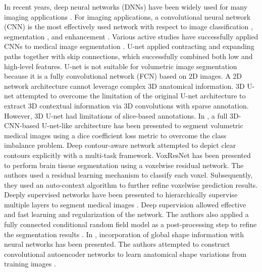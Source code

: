 \documentclass[journal]{IEEEtran}
\begin{document}
In recent years, deep neural networks (DNNs) have been widely used for many imaging applications \cite{simonyan2014very, he2016deep, szegedy2017inception, long2015fully, noh2015learning, badrinarayanan2017segnet, fu2017stacked, dong2016image, jegou2017one}. For imaging applications, a convolutional neural network (CNN) is the most effectively used network with respect to image classification \cite{simonyan2014very, he2016deep, szegedy2017inception}, segmentation \cite{long2015fully, noh2015learning, badrinarayanan2017segnet, fu2017stacked, jegou2017one}, and enhancement \cite{dong2016image, burger2012image}. Various active studies have successfully applied CNNs to medical image segmentation \cite{ronneberger2015u, cciccek20163d, chen2017voxresnet, milletari2016v, chen2017dcan, kamnitsas2017efficient, havaei2017brain, dou20173d, jegou2017one, chen2018deeplab, oktay2018anatomically, gibson2018automatic}. U-net \cite{ronneberger2015u} applied contracting and expanding paths together with skip connections, which successfully combined both low and high-level features. U-net is not suitable for volumetric image segmentation because it is a fully convolutional network (FCN) based on 2D images. A 2D network architecture cannot leverage complex 3D anatomical information. 3D U-net \cite{cciccek20163d} attempted to overcome the limitation of the original U-net architecture to extract 3D contextual information via 3D convolutions with sparse annotation. However, 3D U-net had limitations of slice-based annotations. In \cite{milletari2016v}, a full 3D-CNN-based U-net-like architecture has been presented to segment volumetric medical images using a dice coefficient loss metric to overcome the class imbalance problem. Deep contour-aware network \cite{chen2017dcan} attempted to depict clear contours explicitly with a multi-task framework. VoxResNet \cite{chen2017voxresnet} has been presented to perform brain tissue segmentation using a voxelwise residual network. The authors used a residual learning mechanism \cite{he2016deep} to classify each voxel. Subsequently, they used an auto-context algorithm \cite{tu2010auto} to further refine voxelwise prediction results. Deeply supervised networks \cite{lee2015deeply} have been presented to hierarchically supervise multiple layers to segment medical images \cite{dou20173d}. Deep supervision \cite{dou20173d} allowed effective and fast learning and regularization of the network. The authors also applied a fully connected conditional random field model as a post-processing step to refine the segmentation results \cite{dou20173d}. In \cite{oktay2018anatomically}, incorporation of global shape information with neural networks has been presented. The authors attempted to construct convolutional autoencoder networks to learn anatomical shape variations from training images \cite{oktay2018anatomically}.\par
\end{document}
